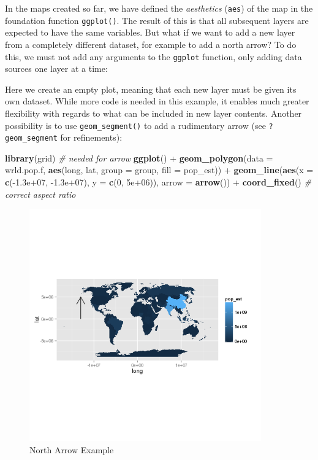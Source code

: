 \documentclass[]{article}
\newenvironment{Shaded}{}{}
\newcommand{\KeywordTok}[1]{\textcolor[rgb]{0.00,0.44,0.13}{\textbf{{#1}}}}
\newcommand{\DataTypeTok}[1]{\textcolor[rgb]{0.56,0.13,0.00}{{#1}}}
\newcommand{\DecValTok}[1]{\textcolor[rgb]{0.25,0.63,0.44}{{#1}}}
\newcommand{\FloatTok}[1]{\textcolor[rgb]{0.25,0.63,0.44}{{#1}}}
\newcommand{\CommentTok}[1]{\textcolor[rgb]{0.38,0.63,0.69}{\textit{{#1}}}}
\newcommand{\NormalTok}[1]{{#1}}
\let\Oldincludegraphics\includegraphics
\renewcommand{\includegraphics}[1]{\Oldincludegraphics[width=10cm]{#1}}
\begin{document}
In the maps created so far, we have defined the \emph{aesthetics}
(\texttt{aes}) of the map in the foundation function \texttt{ggplot()}.
The result of this is that all subsequent layers are expected to have
the same variables. But what if we want to add a new layer from a
completely different dataset, for example to add a north arrow? To do
this, we must not add any arguments to the \texttt{ggplot} function,
only adding data sources one layer at a time:

Here we create an empty plot, meaning that each new layer must be given
its own dataset. While more code is needed in this example, it enables
much greater flexibility with regards to what can be included in new
layer contents. Another possibility is to use \texttt{geom\_segment()}
to add a rudimentary arrow (see \texttt{?geom\_segment} for
refinements):

\begin{Shaded}
\begin{Highlighting}[]
\KeywordTok{library}\NormalTok{(grid)  }\CommentTok{# needed for arrow}
\KeywordTok{ggplot}\NormalTok{() + }\KeywordTok{geom_polygon}\NormalTok{(}\DataTypeTok{data =} \NormalTok{wrld.pop.f, }\KeywordTok{aes}\NormalTok{(long, lat, }\DataTypeTok{group =} \NormalTok{group, }\DataTypeTok{fill =} \NormalTok{pop_est)) + }
    \KeywordTok{geom_line}\NormalTok{(}\KeywordTok{aes}\NormalTok{(}\DataTypeTok{x =} \KeywordTok{c}\NormalTok{(-}\FloatTok{1.3e+07}\NormalTok{, -}\FloatTok{1.3e+07}\NormalTok{), }\DataTypeTok{y =} \KeywordTok{c}\NormalTok{(}\DecValTok{0}\NormalTok{, }\FloatTok{5e+06}\NormalTok{)), }\DataTypeTok{arrow =} \KeywordTok{arrow}\NormalTok{()) + }
    \KeywordTok{coord_fixed}\NormalTok{()  }\CommentTok{# correct aspect ratio}
\end{Highlighting}
\end{Shaded}

\begin{figure}[htbp]
\centering
\includegraphics{figure/North_Arrow_Example.png}
\caption{North Arrow Example}
\end{figure}
\end{document}
